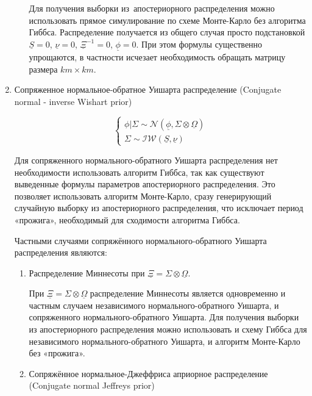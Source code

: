 \documentclass[11pt]{article} %
\newcommand{\cN}{\mathcal{N}}
\newcommand{\cIW}{\mathcal{IW}}
\newcommand{\prior}{\underline}
\begin{document}
\begin{enumerate}
\begin{enumerate}
Для получения выборки из~апостериорного распределения можно
использовать прямое симулирование по схеме Монте-Карло без алгоритма
Гиббса. %
Распределение получается из общего случая просто подстановкой $\prior
S=0$, $\prior \nu =0$, $\prior \Xi^{-1}=0$, $\prior\phi=0$. При этом
формулы существенно упрощаются, в частности исчезает необходимость
обращать матрицу размера $km\times km$.


\end{enumerate}

\item Сопряженное нормальное-обратное Уишарта распределение (Conjugate normal - inverse Wishart prior)


\begin{equation}
\begin{cases}
\phi|\Sigma\sim \cN (\prior \phi, \Sigma\otimes\prior \Omega)\\
\Sigma\sim \cIW(\prior S, \prior \nu)
\end{cases}
\end{equation}


Для сопряженного нормального-обратного Уишарта распределения нет
необходимости использовать алгоритм Гиббса, так как существуют выведенные формулы
параметров апостериорного распределения. Это позволяет использовать алгоритм
Монте-Карло, сразу генерирующий случайную выборку из апостериорного
распределения, что исключает период «прожига», необходимый для сходимости
алгоритма Гиббса.


Частными случаями сопряжённого нормального-обратного Уишарта
распределения являются:

\begin{enumerate}

\item Распределение Миннесоты при  $\prior \Xi =  \Sigma \otimes
\prior \Omega $.



При $\prior \Xi =  \Sigma \otimes \prior \Omega $ распределение
Миннесоты является одновременно и частным случаем независимого
нормального-обратного Уишарта, и сопряженного нормального-обратного
Уишарта. Для получения выборки из апостериорного распределения можно
использовать и схему Гиббса для независимого нормального-обратного
Уишарта, и алгоритм Монте-Карло без «прожига».



\item Сопряжённое нормальное-Джеффриса априорное распределение (Conjugate normal Jeffreys prior)



\end{enumerate}
\end{enumerate}
\end{document}
